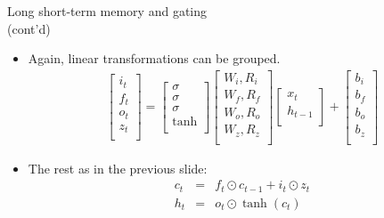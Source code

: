 \begin{frame}{Long short-term memory and gating\\ (cont'd)}
\begin{itemize}
\item Again, linear transformations can be grouped.
\vspace{-3mm}
    \begin{eqnarray*}
      \begin{bmatrix}
           i_t \\
           f_t \\
           o_t \\
           z_t \\
         \end{bmatrix}
= 
      \begin{bmatrix}
           \sigma \\
           \sigma \\
           \sigma \\
           \tanh \\
         \end{bmatrix}
      \begin{bmatrix}
           W_{i}, R_{i} \\
           W_{f}, R_{f} \\
           W_{o}, R_{o} \\
           W_{z}, R_{z} \\
         \end{bmatrix} 
      \begin{bmatrix}
           x_t \\
           h_{t-1} \\
         \end{bmatrix}
+ 
      \begin{bmatrix}
           b_i \\
           b_f \\
           b_o \\
           b_z \\
         \end{bmatrix}
    \end{eqnarray*}
\item The rest as in the previous slide:
    \begin{eqnarray*}
    c_{t} &=&  f_{t} \odot c_{t-1} + i_{t} \odot  z_t \\
    h_t &=& o_{t} \odot \tanh(c_t)
    \end{eqnarray*}

\end{itemize}
\end{frame}
